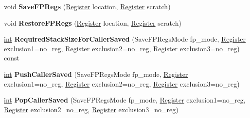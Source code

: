 \begin{DoxyCompactItemize}
\item 
\mbox{\label{classv8_1_1internal_1_1TurboAssembler_a9afc37f37ff7eb34c77a9761f3c45228}} 
void {\bfseries Save\+F\+P\+Regs} (\mbox{\hyperlink{classv8_1_1internal_1_1Register}{Register}} location, \mbox{\hyperlink{classv8_1_1internal_1_1Register}{Register}} scratch)
\item 
\mbox{\label{classv8_1_1internal_1_1TurboAssembler_a17432c60983801ce846fe51391865edc}} 
void {\bfseries Restore\+F\+P\+Regs} (\mbox{\hyperlink{classv8_1_1internal_1_1Register}{Register}} location, \mbox{\hyperlink{classv8_1_1internal_1_1Register}{Register}} scratch)
\item 
\mbox{\label{classv8_1_1internal_1_1TurboAssembler_ade281f6d328e2fdd51963e91bda13365}} 
\mbox{\hyperlink{classint}{int}} {\bfseries Required\+Stack\+Size\+For\+Caller\+Saved} (Save\+F\+P\+Regs\+Mode fp\+\_\+mode, \mbox{\hyperlink{classv8_1_1internal_1_1Register}{Register}} exclusion1=no\+\_\+reg, \mbox{\hyperlink{classv8_1_1internal_1_1Register}{Register}} exclusion2=no\+\_\+reg, \mbox{\hyperlink{classv8_1_1internal_1_1Register}{Register}} exclusion3=no\+\_\+reg) const
\item 
\mbox{\label{classv8_1_1internal_1_1TurboAssembler_a05799e0b139129becdabdf8af8e18810}} 
\mbox{\hyperlink{classint}{int}} {\bfseries Push\+Caller\+Saved} (Save\+F\+P\+Regs\+Mode fp\+\_\+mode, \mbox{\hyperlink{classv8_1_1internal_1_1Register}{Register}} exclusion1=no\+\_\+reg, \mbox{\hyperlink{classv8_1_1internal_1_1Register}{Register}} exclusion2=no\+\_\+reg, \mbox{\hyperlink{classv8_1_1internal_1_1Register}{Register}} exclusion3=no\+\_\+reg)
\item 
\mbox{\label{classv8_1_1internal_1_1TurboAssembler_a5f104f3d3c969b063fb4d1dfdc643b1c}} 
\mbox{\hyperlink{classint}{int}} {\bfseries Pop\+Caller\+Saved} (Save\+F\+P\+Regs\+Mode fp\+\_\+mode, \mbox{\hyperlink{classv8_1_1internal_1_1Register}{Register}} exclusion1=no\+\_\+reg, \mbox{\hyperlink{classv8_1_1internal_1_1Register}{Register}} exclusion2=no\+\_\+reg, \mbox{\hyperlink{classv8_1_1internal_1_1Register}{Register}} exclusion3=no\+\_\+reg)
\item 

\end{DoxyCompactItemize}

